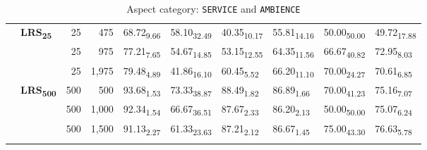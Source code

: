 \begin{table}[H]
\begin{subtable}{\linewidth}
{\begin{tabular}{llrrllllll}
\arrayrulecolor{gray}\cline{2-10}\arrayrulecolor{black}
\hline
\multirow{6}{*}{\textbf{GPT-3.5-turbo}} & \multirow{3}{*}{\textbf{LRS\textsubscript{25}}} & 25 & 475 & 68.72\textsubscript{9.66} & 58.10\textsubscript{32.49} & 40.35\textsubscript{10.17} & 55.81\textsubscript{14.16} & 50.00\textsubscript{50.00} & 49.72\textsubscript{17.88} \\
 &  & 25 & 975 & 77.21\textsubscript{7.65} & 54.67\textsubscript{14.85} & 53.15\textsubscript{12.55} & 64.35\textsubscript{11.56} & 66.67\textsubscript{40.82} & 72.95\textsubscript{8.03} \\
 &  & 25 & 1,975 & 79.48\textsubscript{4.89} & 41.86\textsubscript{16.10} & 60.45\textsubscript{5.52} & 66.20\textsubscript{11.10} & 70.00\textsubscript{24.27} & 70.61\textsubscript{6.85} \\
\arrayrulecolor{gray}\cline{2-10}\arrayrulecolor{black}
 & \multirow{3}{*}{\textbf{LRS\textsubscript{500}}} & 500 & 500 & 93.68\textsubscript{1.53} & 73.33\textsubscript{38.87} & 88.49\textsubscript{1.82} & 86.89\textsubscript{1.66} & 70.00\textsubscript{41.23} & 75.16\textsubscript{7.07} \\
 &  & 500 & 1,000 & 92.34\textsubscript{1.54} & 66.67\textsubscript{36.51} & 87.67\textsubscript{2.33} & 86.20\textsubscript{2.13} & 50.00\textsubscript{50.00} & 75.07\textsubscript{6.24} \\
 &  & 500 & 1,500 & 91.13\textsubscript{2.27} & 61.33\textsubscript{23.63} & 87.21\textsubscript{2.12} & 86.67\textsubscript{1.45} & 75.00\textsubscript{43.30} & 76.63\textsubscript{5.78} \\
\arrayrulecolor{gray}\cline{2-10}\arrayrulecolor{black}
\hline
\end{tabular}
}
\caption{Aspect category: \texttt{SERVICE} and \texttt{AMBIENCE}}
\end{subtable}
\begin{subtable}{\linewidth}
\vspace{0.3cm}
\renewcommand{\arraystretch}{1.0}
\centering
{}
\end{subtable}
\end{table}
